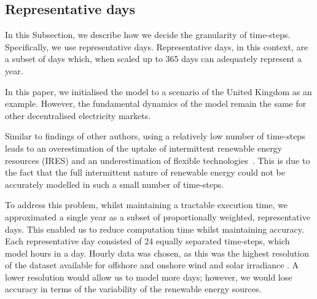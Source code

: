 
\subsection{Representative days}
\label{elecsim:sec:representative}


In this Subsection, we describe how we decide the granularity of time-steps. Specifically, we use representative days. Representative days, in this context, are a subset of days which, when scaled up to 365 days can adequately represent a year. 

In this paper, we initialised the model to a scenario of the United Kingdom as an example. However, the fundamental dynamics of the model remain the same for other decentralised electricity markets.






Similar to findings of other authors, using a relatively low number of time-steps leads to an overestimation of the uptake of intermittent renewable energy resources (IRES) and an underestimation of flexible technologies~\cite{Haydt2011,Ludig2011}. This is due to the fact that the full intermittent nature of renewable energy could not be accurately modelled in such a small number of time-steps. 


To address this problem, whilst maintaining a tractable execution time, we approximated a single year as a subset of proportionally weighted, representative days. This enabled us to reduce computation time whilst maintaining accuracy. Each representative day consisted of 24 equally separated time-steps, which model hours in a day. Hourly data was chosen, as this was the highest resolution of the dataset available for offshore and onshore wind and solar irradiance \cite{Pfenninger2016}. A lower resolution would allow us to model more days; however, we would lose accuracy in terms of the variability of the renewable energy sources. 


